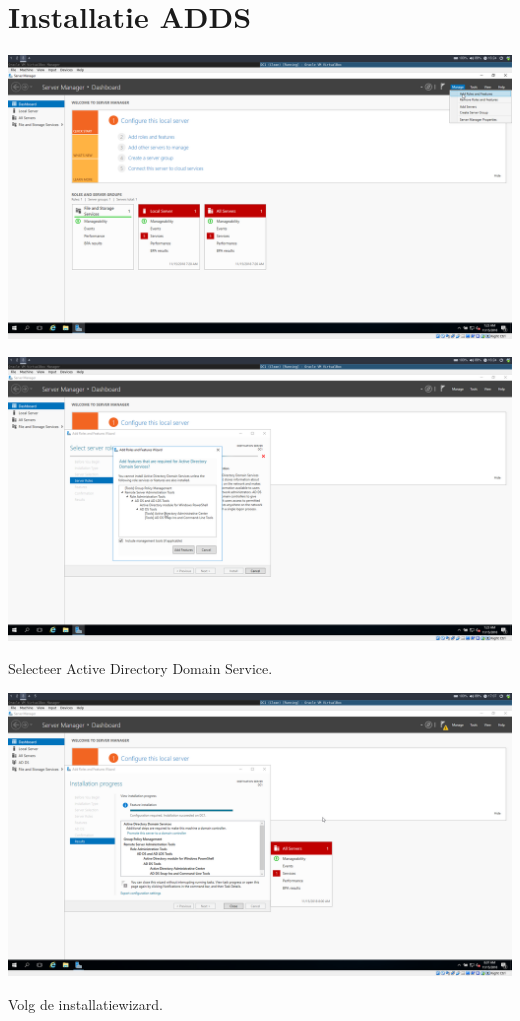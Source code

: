 \documentclass[a4paper]{article}
\begin{document}
\section{Installatie ADDS}
\begin{center}
	\includegraphics[width=15cm]{Pictures/DC1/ADDS/1542295445.png}
\end{center}
\begin{center}
	\includegraphics[width=15cm]{Pictures/DC1/ADDS/1542295457.png}
	
	Selecteer Active Directory Domain Service.
\end{center}
\begin{center}
	\includegraphics[width=15cm]{Pictures/DC1/ADDS/1542298075.png}
	
	Volg de installatiewizard.
\end{center}
\end{document}

